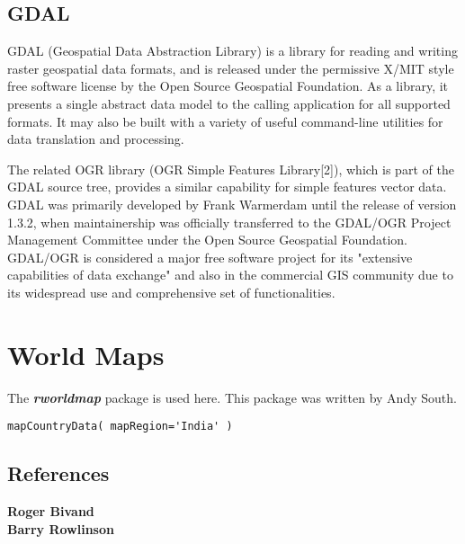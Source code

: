 \documentclass[12pt]{article}
\begin{document}
\subsection*{GDAL}
GDAL (Geospatial Data Abstraction Library) is a library for reading and writing raster geospatial data formats, and is released under the permissive X/MIT style free software license by the Open Source Geospatial Foundation. As a library, it presents a single abstract data model to the calling application for all supported formats. It may also be built with a variety of useful command-line utilities for data translation and processing.

The related OGR library (OGR Simple Features Library[2]), which is part of the GDAL source tree, provides a similar capability for simple features vector data.
GDAL was primarily developed by Frank Warmerdam until the release of version 1.3.2, when maintainership was officially transferred to the GDAL/OGR Project Management Committee under the Open Source Geospatial Foundation.
GDAL/OGR is considered a major free software project for its "extensive capabilities of data exchange" and also in the commercial GIS community due to its widespread use and comprehensive set of functionalities.

\section{World Maps}
The \textbf{\textit{rworldmap}} package is used here. This package was written by Andy South. 
\begin{framed}
\begin{verbatim}
mapCountryData( mapRegion='India' )
\end{verbatim}
\end{framed}

\subsection*{References}
\textbf{Roger Bivand}\\
\textbf{Barry Rowlinson}\\
\end{document}
